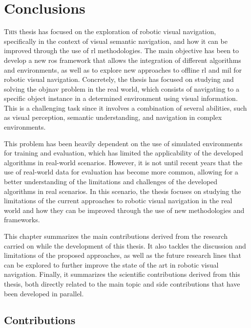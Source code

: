 \chapter{Conclusions}\label{ch:conclusions}

\lettrine{\textcolor{accent_color}{T}}{his} thesis has focused on the exploration of robotic visual navigation, specifically in the context of visual semantic navigation, and how it can be improved through the use of \acrshort{rl} methodologies.
The main objective has been to develop a new \acrshort{ros} framework that allows the integration of different algorithms and environments, as well as to explore new approaches to offline \acrshort{rl} and \acrshort{mil} for robotic visual navigation.
Concretely, the thesis has focused on studying and solving the \acrshort{objnav} problem in the real world, which consists of navigating to a specific object instance in a determined environment using visual information.
This is a challenging task since it involves a combination of several abilities, such as visual perception, semantic understanding, and navigation in complex environments.

This problem has been heavily dependent on the use of simulated environments for training and evaluation, which has limited the applicability of the developed algorithms in real-world scenarios.
However, it is not until recent years that the use of real-world data for evaluation has become more common, allowing for a better understanding of the limitations and challenges of the developed algorithms in real scenarios.
In this scenario, the thesis focuses on studying the limitations of the current approaches to robotic visual navigation in the real world and how they can be improved through the use of new methodologies and frameworks.

This chapter summarizes the main contributions derived from the research carried on while the development of this thesis.
It also tackles the discussion and limitations of the proposed approaches, as well as the future research lines that can be explored to further improve the state of the art in robotic visual navigation.
Finally, it summarizes the scientific contributions derived from this thesis, both directly related to the main topic and side contributions that have been developed in parallel.

\section{Contributions}\label{sec:contributions}

